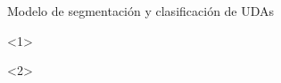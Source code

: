 \documentclass{beamer}
\begin{document}
\begin{frame}{Modelo de segmentación y clasificación de UDAs}
    \begin{onlyenv}<1>
        \begin{center}
            
        \end{center}
    \end{onlyenv}
    
    \begin{onlyenv}<2>
        \begin{center}
            
        \end{center}
    \end{onlyenv}
\end{frame}
\end{document}
